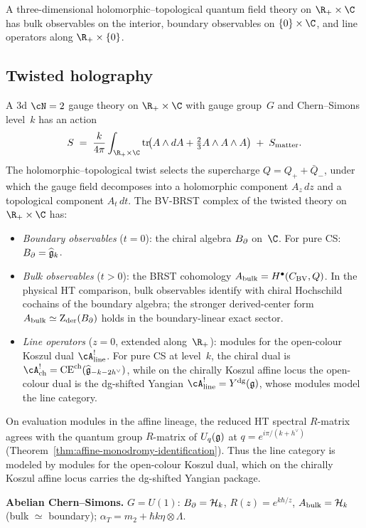 A three-dimensional holomorphic--topological quantum field theory on
$\R_+ \times \C$ has bulk observables on the interior, boundary
observables on $\{0\} \times \C$, and line operators along
$\R_+ \times \{0\}$.

\subsection*{Twisted holography}

A 3d $\cN = 2$ gauge theory on $\R_+ \times \C$ with gauge
group~$G$ and Chern--Simons level~$k$ has an action
\[
S \;=\; \frac{k}{4\pi}\int_{\R_+ \times \C}
\operatorname{tr}\!\bigl(
 A \wedge dA + \tfrac{2}{3} A \wedge A \wedge A
\bigr)
\;+\; S_{\mathrm{matter}}.
\]
The holomorphic--topological twist selects the supercharge
$Q = Q_+ + \bar{Q}_-$, under which the gauge field decomposes into
a holomorphic component $A_z \,dz$ and a topological component
$A_t \,dt$. The BV-BRST complex of the twisted theory on
$\R_+ \times \C$ has:
\begin{itemize}
\item \emph{Boundary observables} ($t = 0$): the chiral algebra
 $B_{\partial}$ on~$\C$. For pure CS: $B_{\partial} = \widehat{\mathfrak{g}}_k$.
\item \emph{Bulk observables} ($t > 0$): the BRST cohomology
 $A_{\mathrm{bulk}} = H^\bullet(C_{\mathrm{BV}}, Q)$.
 In the physical HT comparison, bulk observables identify with
 chiral Hochschild cochains of the boundary algebra; the stronger
 derived-center form $A_{\mathrm{bulk}}\simeq\operatorname{Z}_{\mathrm{der}}(B_{\partial})$ holds in the
 boundary-linear exact sector.
\item \emph{Line operators} ($z = 0$, extended along~$\R_+$):
 modules for the open-colour Koszul dual
 $\cA^!_{\mathrm{line}}$. For pure CS at level~$k$, the
 chiral dual is $\cA^!_{\mathrm{ch}} =
 \mathrm{CE}^{\mathrm{ch}}(\widehat{\fg}_{-k-2h^\vee})$, while on the
 chirally Koszul affine locus the open-colour dual is the
 dg-shifted Yangian $\cA^!_{\mathrm{line}} = \Ydg(\fg)$,
 whose modules model the line category.
\end{itemize}
On evaluation modules in the affine lineage, the reduced HT
spectral $R$-matrix agrees with the quantum group $R$-matrix of
$U_q(\mathfrak{g})$ at $q = e^{i\pi/(k+h^\vee)}$
\textup{(}Theorem~\textup{\ref{thm:affine-monodromy-identification}}\textup{)}.
Thus the line category is modeled by modules for the
open-colour Koszul dual, which on the chirally Koszul affine
locus carries the dg-shifted Yangian package.

\medskip
\noindent\textbf{Abelian Chern--Simons.}\enspace
$G = U(1)$: $B_{\partial} = \mathcal{H}_k$,
$R(z) = e^{k\hbar/z}$, $A_{\mathrm{bulk}} = \mathcal{H}_k$ (bulk $\simeq$ boundary);
$\alpha_T = m_2 + \hbar k \eta \otimes \Lambda$.

